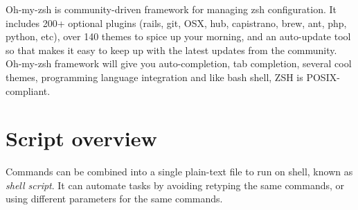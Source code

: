   Oh-my-zsh is community-driven framework for managing zsh configuration. It
  includes 200+ optional plugins (rails, git, OSX, hub, capistrano, brew, ant,
  php, python, etc), over 140 themes to spice up your morning, and an
  auto-update tool so that makes it easy to keep up with the latest updates from
  the community. Oh-my-zsh framework will give you auto-completion, tab
  completion, several cool themes, programming language integration and like
  bash shell, ZSH is POSIX-compliant.

  

\section{Script overview}
\label{sec:shell_scripting}

Commands can be combined into a single plain-text file to run on shell, known as
{\it shell script}. It can automate tasks by avoiding retyping the same
commands, or using different parameters for the same commands.

